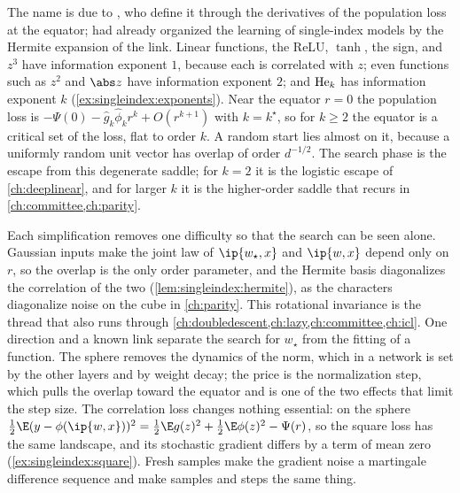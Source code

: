 \begin{refsection}
The name is due to \textcite{BenArousGheissariJagannath2021}, who define it through the derivatives of the population loss at the equator; \textcite{DudejaHsu2018} had already organized the learning of single-index models by the Hermite expansion of the link. Linear functions, the ReLU, $\tanh$, the sign, and $z^3$ have information exponent $1$, because each is correlated with $z$; even functions such as $z^2$ and $\abs z$ have information exponent $2$; and $\operatorname{He}_k$ has information exponent $k$ (\cref{ex:singleindex:exponents}). Near the equator $r=0$ the population loss is $-\Psi(0)-\hat g_k\hat\phi_kr^k+O(r^{k+1})$ with $k=k^\star$, so for $k\ge2$ the equator is a critical set of the loss, flat to order $k$. A random start lies almost on it, because a uniformly random unit vector has overlap of order $d^{-1/2}$. The search phase is the escape from this degenerate saddle; for $k=2$ it is the logistic escape of \cref{ch:deeplinear}, and for larger $k$ it is the higher-order saddle that recurs in \cref{ch:committee,ch:parity}.

Each simplification removes one difficulty so that the search can be seen alone. Gaussian inputs make the joint law of $\ip{w_\star,x}$ and $\ip{w,x}$ depend only on $r$, so the overlap is the only order parameter, and the Hermite basis diagonalizes the correlation of the two (\cref{lem:singleindex:hermite}), as the characters diagonalize noise on the cube in \cref{ch:parity}. This rotational invariance is the thread that also runs through \cref{ch:doubledescent,ch:lazy,ch:committee,ch:icl}. One direction and a known link separate the search for $w_\star$ from the fitting of a function. The sphere removes the dynamics of the norm, which in a network is set by the other layers and by weight decay; the price is the normalization step, which pulls the overlap toward the equator and is one of the two effects that limit the step size. The correlation loss changes nothing essential: on the sphere $\frac12\E(y-\phi(\ip{w,x}))^2=\frac12\E g(z)^2+\frac12\E\phi(z)^2-\Psi(r)$, so the square loss has the same landscape, and its stochastic gradient differs by a term of mean zero (\cref{ex:singleindex:square}). Fresh samples make the gradient noise a martingale difference sequence and make samples and steps the same thing.


\end{refsection}

